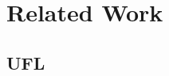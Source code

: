 \documentclass[hyperref,dvipsnames,svgnames,compress]{beamer}
\begin{document}
\section[Related Work]{Related Work}

\subsection{UFL}
\end{document}
